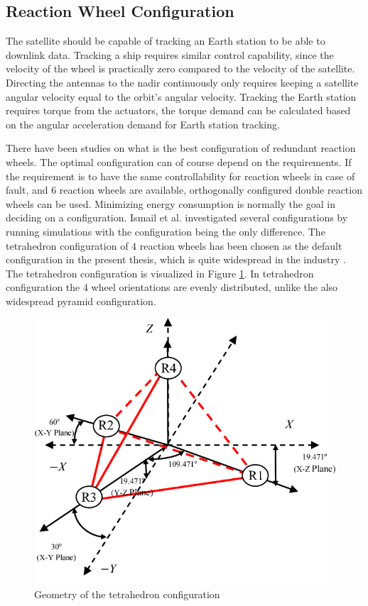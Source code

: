 \subsection{Reaction Wheel Configuration}
The satellite should be capable of tracking an Earth station to be able to downlink data. Tracking a ship requires similar control capability, since the velocity of the wheel is practically zero compared to the velocity of the satellite. Directing the antennas to the nadir continuously only requires keeping a satellite angular velocity equal to the orbit's angular velocity.
Tracking the Earth station requires torque from the actuators, the torque demand can be calculated based on the angular acceleration demand for Earth station tracking.

There have been studies on what is the best configuration of redundant reaction wheels. The optimal configuration can of course depend on the requirements. If the requirement is to have the same controllability for reaction wheels in case of fault, and 6 reaction wheels are available, orthogonally configured double reaction wheels can be used. Minimizing energy consumption is normally the goal in deciding on a configuration. Ismail et al. \cite{ReactionWheelConfigSim} investigated several configurations by running simulations with the configuration being the only difference. The tetrahedron configuration of 4 reaction wheels has been chosen as the default configuration in the present thesis, which is quite widespread in the industry \cite{reactConfigNasa}. The tetrahedron configuration is visualized in Figure \ref{fig:tetrahedron}.
In tetrahedron configuration the 4 wheel orientations are evenly distributed, unlike the also widespread pyramid configuration. 

\begin{figure}[H]
	\centering 
	\includegraphics[width=120mm]{figures/tetrahedron}	
	\caption{Geometry of the tetrahedron configuration}
	\label{fig:tetrahedron}
\end{figure}

